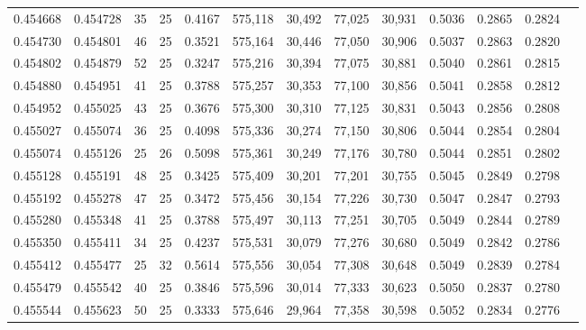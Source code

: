\begin{tabular}{rrrrrrrrrrrrr}
0.454668 & 0.454728 &    35 &  25 &                                     0.4167 & 575,118 &  30,492 &  77,025 &  30,931 & 0.5036 & 0.2865 & 0.2824 \\
0.454730 & 0.454801 &    46 &  25 &                                     0.3521 & 575,164 &  30,446 &  77,050 &  30,906 & 0.5037 & 0.2863 & 0.2820 \\
0.454802 & 0.454879 &    52 &  25 &                                     0.3247 & 575,216 &  30,394 &  77,075 &  30,881 & 0.5040 & 0.2861 & 0.2815 \\
0.454880 & 0.454951 &    41 &  25 &                                     0.3788 & 575,257 &  30,353 &  77,100 &  30,856 & 0.5041 & 0.2858 & 0.2812 \\
0.454952 & 0.455025 &    43 &  25 &                                     0.3676 & 575,300 &  30,310 &  77,125 &  30,831 & 0.5043 & 0.2856 & 0.2808 \\
0.455027 & 0.455074 &    36 &  25 &                                     0.4098 & 575,336 &  30,274 &  77,150 &  30,806 & 0.5044 & 0.2854 & 0.2804 \\
0.455074 & 0.455126 &    25 &  26 &                                     0.5098 & 575,361 &  30,249 &  77,176 &  30,780 & 0.5044 & 0.2851 & 0.2802 \\
0.455128 & 0.455191 &    48 &  25 &                                     0.3425 & 575,409 &  30,201 &  77,201 &  30,755 & 0.5045 & 0.2849 & 0.2798 \\
0.455192 & 0.455278 &    47 &  25 &                                     0.3472 & 575,456 &  30,154 &  77,226 &  30,730 & 0.5047 & 0.2847 & 0.2793 \\
0.455280 & 0.455348 &    41 &  25 &                                     0.3788 & 575,497 &  30,113 &  77,251 &  30,705 & 0.5049 & 0.2844 & 0.2789 \\
0.455350 & 0.455411 &    34 &  25 &                                     0.4237 & 575,531 &  30,079 &  77,276 &  30,680 & 0.5049 & 0.2842 & 0.2786 \\
0.455412 & 0.455477 &    25 &  32 &                                     0.5614 & 575,556 &  30,054 &  77,308 &  30,648 & 0.5049 & 0.2839 & 0.2784 \\
0.455479 & 0.455542 &    40 &  25 &                                     0.3846 & 575,596 &  30,014 &  77,333 &  30,623 & 0.5050 & 0.2837 & 0.2780 \\
0.455544 & 0.455623 &    50 &  25 &                                     0.3333 & 575,646 &  29,964 &  77,358 &  30,598 & 0.5052 & 0.2834 & 0.2776 \\

\end{tabular}
